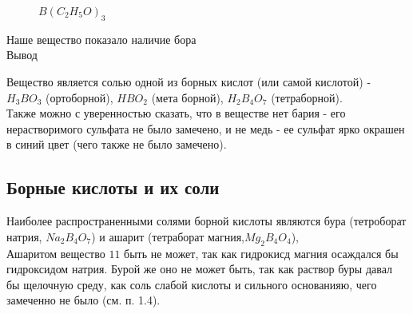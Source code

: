 \documentclass[a4paper,14pt,notitlepage,twoside]{article}
\begin{document}
            \begin{figure}[h]
                \caption{$B(C_2H_5O)_3$}
            \end{figure}

            Наше вещество показало наличие бора\\

            Вывод

            Вещество является солью одной из борных кислот (или самой кислотой) -
            $H_3BO_3$ (ортоборной), $HBO_2$ (мета борной), $H_2B_4O_7$ (тетраборной).\\

            Также можно с уверенностью сказать, что в веществе нет бария - его нерастворимого сульфата
            не было замечено, и не медь - ее сульфат ярко окрашен в синий цвет (чего также не было замечено).

        \subsection{Борные кислоты  и их соли}
            Наиболее распространенными солями борной кислоты являются бура (тетроборат натрия, $Na_2B_4O_7$) и ашарит
            (тетраборат магния,$Mg_2B_4O_4$),\\

            Ашаритом вещество $11$ быть не может, так как гидрокисд магния осаждался бы гидроксидом натрия.
            Бурой же оно не может быть, так как раствор буры давал бы щелочную среду, как соль слабой кислоты и
            сильного основанияю, чего замеченно не было (см. п. 1.4). \\
\end{document}
